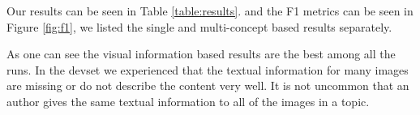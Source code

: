 \documentclass{acm_proc_article-me}
\begin{document}
Our results can be seen in Table \ref{table:results}. and the F1 metrics can be seen in Figure \ref{fig:f1}, we listed the single and multi-concept based results separately. 

As one can see the visual information based results are the best among all the runs. In the devset we experienced that the textual information for many images are missing or do not describe the content very well. It is not uncommon that an author gives the same textual information to all of the images in a topic.



\end{document}
